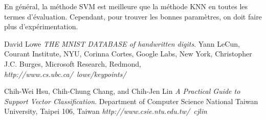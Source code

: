 \documentclass[]{article}   %
\begin{document}
En général, la méthode SVM est meilleure que la méthode KNN en toutes les termes 
d'évaluation. Cependant, pour trouver les bonnes paramètres, on doit faire plus 
d'expérimentation.

\clearpage
\begin{thebibliography}{9}
  David Lowe
  \emph{THE MNIST DATABASE of handwritten digits}.
  Yann LeCun, Courant Institute, NYU,
  Corinna Cortes, Google Labs, New York,
  Christopher J.C. Burges, Microsoft Research, Redmond,
  \emph{http://www.cs.ubc.ca/~lowe/keypoints/}
   
  Chih-Wei Hsu, Chih-Chung Chang, and Chih-Jen Lin
  \emph{A Practical Guide to Support Vector Classification}.
  Department of Computer Science
National Taiwan University, Taipei 106, Taiwan
  \emph{http://www.csie.ntu.edu.tw/~cjlin}
 
\end{thebibliography}
\end{document}
